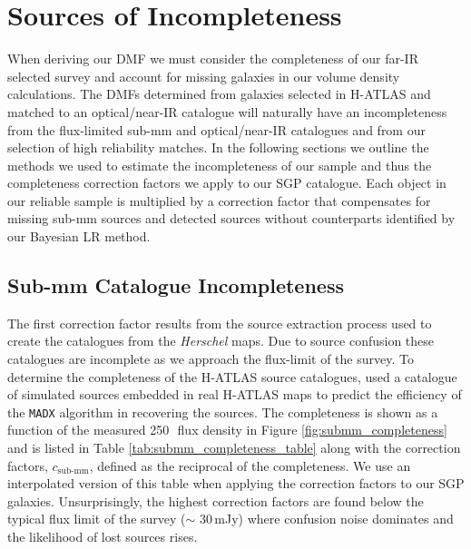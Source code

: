 \section{Sources of Incompleteness}

When deriving our DMF we must consider the completeness of our far-IR selected survey and account for missing galaxies in our volume density calculations. The DMFs determined from galaxies selected in H-ATLAS and matched to an optical/near-IR catalogue will naturally have an incompleteness from the flux-limited sub-mm and optical/near-IR catalogues and from our selection of high reliability matches. In the following sections we outline the methods we used to estimate the incompleteness of our sample and thus the completeness correction factors we apply to our SGP catalogue. Each object in our reliable sample is multiplied by a correction factor that compensates for missing sub-mm sources and detected sources without counterparts identified by our Bayesian LR method. 

\subsection{Sub-mm Catalogue Incompleteness}

The first correction factor results from the source extraction process used to create the catalogues from the \textit{Herschel} maps. Due to source confusion these catalogues are incomplete as we approach the flux-limit of the survey. To determine the completeness of the H-ATLAS source catalogues, \citealt{Valiante_2016} used a catalogue of simulated sources embedded in real H-ATLAS maps to predict the efficiency of the \texttt{MADX} algorithm in recovering the sources. The completeness is shown as a function of the measured 250\,\micron\ flux density in Figure \ref{fig:submm_completeness} and is listed in Table \ref{tab:submm_completeness_table} along with the correction factors, $c_{\textrm{sub-mm}}$, defined as the reciprocal of the completeness. We use an interpolated version of this table when applying the correction factors to our SGP galaxies. Unsurprisingly, the highest correction factors are found below the typical flux limit of the survey ($\sim$ 30\,mJy) where confusion noise dominates and the likelihood of lost sources rises. 

